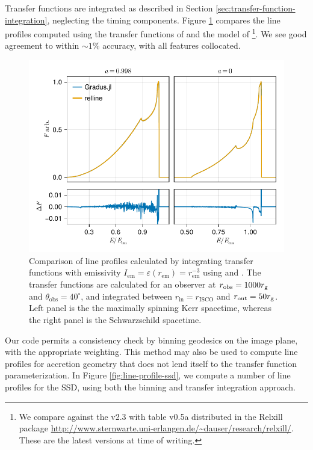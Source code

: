 \documentclass[fleqn,usenatbib]{mnras}
\begin{document}
Transfer functions are integrated as described in Section \ref{sec:transfer-function-integration}, neglecting the timing components. Figure \ref{fig:relline-comparison} compares the line profiles computed using the transfer functions of \Gradus and the \relline model of \cite{dauser_broad_2010}\footnote{We compare against the \relline v2.3 with table v0.5a distributed in the Relxill package \url{http://www.sternwarte.uni-erlangen.de/~dauser/research/relxill/}. These are the latest versions at time of writing.}. We see good agreement to within $\sim 1\%$ accuracy, with all features collocated.

\begin{figure}
	\centering
	\includegraphics[width=0.99\linewidth]{figures/lineprofiles.comparison.pdf}
	\caption{Comparison of line profiles calculated by integrating transfer functions with emissivity $I_\text{em} = \varepsilon(r_\text{em}) = r_\text{em}^{-3}$ using \Gradus and \relline. The transfer functions are calculated for an observer at $r_\text{obs} = 1000r_\text{g}$ and $\theta_\text{obs} = 40^\circ$, and integrated between $r_\text{in} = r_\text{ISCO}$ and $r_\text{out} = 50 r_\text{g}$. Left panel is the the maximally spinning Kerr spacetime, whereas the right panel is the Schwarzschild spacetime.}
	\label{fig:relline-comparison}
\end{figure}

Our code permits a consistency check by binning geodesics on the image plane, with the appropriate weighting. This method may also be used to compute line profiles for accretion geometry that does not lend itself to the transfer function parameterization. In Figure \ref{fig:line-profile-ssd}, we compute a number of line profiles for the SSD, using both the binning and transfer integration approach. 
\end{document}
